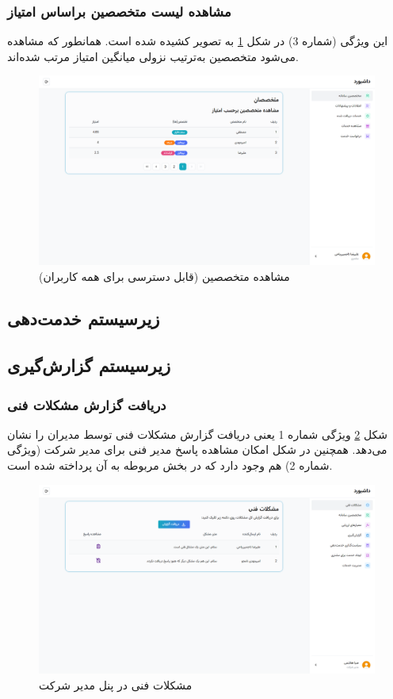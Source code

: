 \subsubsection{مشاهده لیست متخصصین براساس امتیاز}
این ویژگی (شماره 3) در شکل
\ref{ctmr-specialists}
به تصویر کشیده شده است. همانطور که مشاهده می‌شود متخصصین به‌ترتیب نزولی میانگین امتیاز مرتب شده‌اند.

\begin{figure}[h]
	\centering
	\includegraphics[width=\textwidth]{figs/initial-ui/ctmr-specialists}
	\caption{مشاهده متخصصین (قابل دسترسی برای همه کاربران)}
	\label{ctmr-specialists}
\end{figure}

\subsection{زیرسیستم خدمت‌دهی}

\subsection{زیرسیستم گزارش‌گیری}

\subsubsection{دریافت گزارش مشکلات فنی}
شکل
\ref{mngr-tech-report}
ویژگی شماره 1 یعنی دریافت گزارش مشکلات فنی توسط مدیران را نشان می‌دهد. همچنین در شکل امکان مشاهده پاسخ مدیر فنی برای مدیر شرکت (ویژگی شماره 2) هم وجود دارد که در بخش مربوطه به آن پرداخته شده است.

\begin{figure}[h]
	\centering
	\includegraphics[width=\textwidth]{figs/initial-ui/mngr-tech-report}
	\caption{مشکلات فنی در پنل مدیر شرکت}
	\label{mngr-tech-report}
\end{figure}


